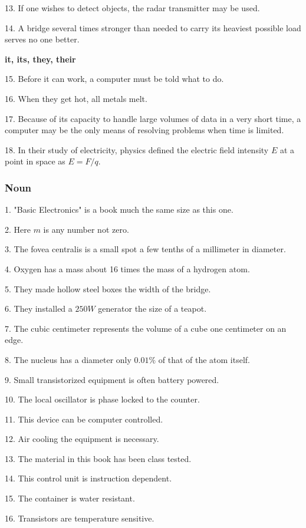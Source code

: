 \documentclass[a4paper,twocolumn,10pt]{article}
\begin{document}
\begin{CJK}{UTF8}{gkai}
	13. If one wishes to detect objects, the radar transmitter may be used.

	14. A bridge several times stronger than needed to carry its heaviest possible load serves
	no one better.

	{\bf it, its, they, their}

	15. Before it can work, a computer must be told what to do.

	16. When they get hot, all metals melt.

	17. Because of its capacity to handle large volumes of data in a very short time,
	a computer may be the only means of resolving problems when time is limited.

	18. In their study of electricity, physics defined the electric field intensity $E$
	at a point in space as $E=F/q$.

	\subsubsection{Noun}

	1. "Basic Electronics" is a book much the same size as this one.

	2. Here $m$ is any number not zero.

	3. The fovea centralis is a small spot a few tenths of a millimeter in diameter.

	4. Oxygen has a mass about 16 times the mass of a hydrogen atom.

	5. They made hollow steel boxes the width of the bridge.

	6. They installed a $250W$ generator the size of a teapot.

	7. The cubic centimeter represents the volume of a cube one centimeter on an edge.

	8. The nucleus has a diameter only $0.01\%$ of that of the atom itself.

	9. Small transistorized equipment is often battery powered.

	10. The local oscillator is phase locked to the counter.

	11. This device can be computer controlled.

	12. Air cooling the equipment is necessary.

	13. The material in this book has been class tested.

	14. This control unit is instruction dependent.

	15. The container is water resistant.

	16. Transistors are temperature sensitive.


\end{CJK}
\end{document}
